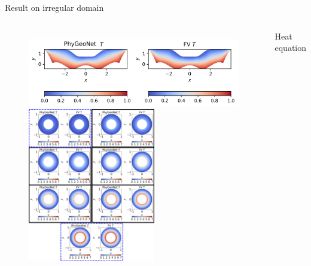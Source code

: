 \documentclass{beamer}
\begin{document}
\begin{frame}{Result on irregular domain}
\begin{columns}[c] %
\begin{figure}
\includegraphics[width=1\textwidth]{DetHeat_1274T.pdf}
\vfill
\includegraphics[width=0.6\textwidth]{ParaHeat_Contour.pdf}
\end{figure}
\centering
Heat equation


\end{columns}
\end{frame}
\end{document}
